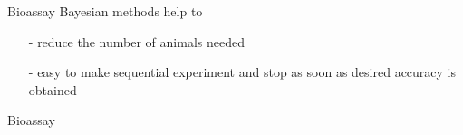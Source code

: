 \documentclass[10pt,handout]{beamer}
\begin{document}
\begin{frame}{Bioassay}
  \pause
   Bayesian methods help to
    \begin{itemize}
    \item[-] reduce the number of animals needed
    \item[-] easy to make sequential experiment and stop as soon as
      desired accuracy is obtained
    \end{itemize}

\end{frame}

\begin{frame}{Bioassay}


\end{frame}
\end{document}
